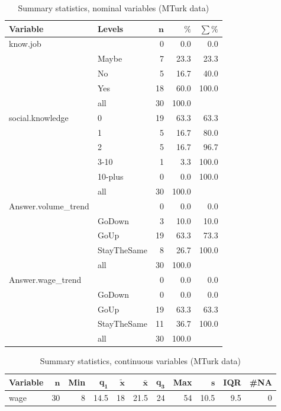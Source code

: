 \documentclass[a4paper,10pt]{article}\usepackage[]{graphicx}\usepackage[]{color}
\begin{document}
\begin{table}[ht]
\centering
{\footnotesize
\begin{tabular}{ll|rrr}
 \textbf{Variable} & \textbf{Levels} & $\mathbf{n}$ & $\mathbf{\%}$ & $\mathbf{\sum \%}$ \\ 
  \hline
know.job &  & 0 & 0.0 & 0.0 \\ 
   & Maybe & 7 & 23.3 & 23.3 \\ 
   & No & 5 & 16.7 & 40.0 \\ 
   & Yes & 18 & 60.0 & 100.0 \\ 
   \hline
 & all & 30 & 100.0 &  \\ 
   \hline
\hline
social.knowledge & 0 & 19 & 63.3 & 63.3 \\ 
   & 1 & 5 & 16.7 & 80.0 \\ 
   & 2 & 5 & 16.7 & 96.7 \\ 
   & 3-10 & 1 & 3.3 & 100.0 \\ 
   & 10-plus & 0 & 0.0 & 100.0 \\ 
   \hline
 & all & 30 & 100.0 &  \\ 
   \hline
\hline
Answer.volume\_trend &  & 0 & 0.0 & 0.0 \\ 
   & GoDown & 3 & 10.0 & 10.0 \\ 
   & GoUp & 19 & 63.3 & 73.3 \\ 
   & StayTheSame & 8 & 26.7 & 100.0 \\ 
   \hline
 & all & 30 & 100.0 &  \\ 
   \hline
\hline
Answer.wage\_trend &  & 0 & 0.0 & 0.0 \\ 
   & GoDown & 0 & 0.0 & 0.0 \\ 
   & GoUp & 19 & 63.3 & 63.3 \\ 
   & StayTheSame & 11 & 36.7 & 100.0 \\ 
   \hline
 & all & 30 & 100.0 &  \\ 
   \hline
\hline
\end{tabular}
}
\caption{Summary statistics, nominal variables (MTurk data)} 
\label{tab1:29-2030}
\end{table}
\begin{table}[ht]
\centering
{\footnotesize
\begin{tabular}{lrrrrrrrrrr}
 \textbf{Variable} & $\mathbf{n}$ & \textbf{Min} & $\mathbf{q_1}$ & $\mathbf{\widetilde{x}}$ & $\mathbf{\bar{x}}$ & $\mathbf{q_3}$ & \textbf{Max} & $\mathbf{s}$ & \textbf{IQR} & \textbf{\#NA} \\ 
  \hline
wage & 30 & 8 & 14.5 & 18 & 21.5 & 24 & 54 & 10.5 & 9.5 & 0 \\ 
  \end{tabular}
}
\caption{Summary statistics, continuous variables (MTurk data)} 
\label{tab2:29-2030}
\end{table}
\end{document}
